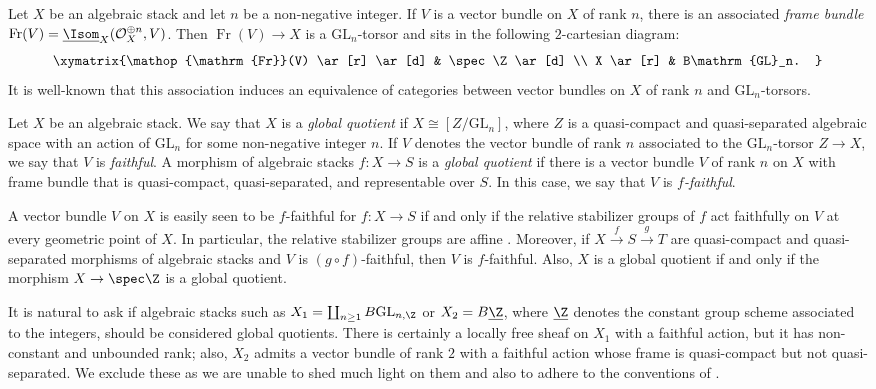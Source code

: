 \documentclass[reqno,a4paper]{amsart}
\numberwithin{Theorem}{section}
\newcommand{\Orb}{\mathcal{O}}
\renewcommand{\GL}{\mathrm{GL}}
\theoremstyle{plain}
\theoremstyle{remark}
\newcommand{\classB}{B}
\DeclareMathOperator{\Frame}{Fr}
\begin{document}
Let $X$ be an algebraic stack and let $n$ be a non-negative
integer. If $V$ is a vector bundle on $X$ of rank $n$, there is an
associated \emph{frame bundle}
$\Frame(V) = \underline{\Isom}_X(\Orb_X^{\oplus n},V)$.  Then
$\Frame(V) \to X$ is a $\GL_n$-torsor and sits in the following
$2$-cartesian diagram:
\[
  \xymatrix{\Frame(V) \ar[r] \ar[d] & \spec \Z\ar[d] \\ X \ar[r] & \classB \GL_n. }
\]
It is well-known that this association induces an equivalence of
categories between vector bundles on $X$ of rank $n$ and
$\GL_n$-torsors. 
\begin{Definition} \label{def:globalquotient}
  Let $X$ be an algebraic stack. We say that $X$ is a \emph{global
    quotient} if $X \cong [Z/\GL_n]$, where $Z$ is a quasi-compact and quasi-separated algebraic space
  with an action of $\GL_n$ for some non-negative integer $n$. If $V$
  denotes the vector bundle of rank $n$ associated to the
  $\GL_n$-torsor $Z \to X$, we say that $V$ is \emph{faithful}. A
  morphism of algebraic stacks $f\colon X \to S$ is a \emph{global
    quotient} if there is a vector bundle $V$ of rank $n$ on $X$ with
   frame bundle that is quasi-compact, quasi-separated, and representable over $S$. In this case, we say that $V$
  is \emph{$f$-faithful}.
\end{Definition}
\begin{remark}
  A vector bundle $V$ on $X$ is easily seen to be $f$-faithful for
  $f\colon X \to S$ if and only if the relative stabilizer groups of
  $f$ act faithfully on $V$ at every geometric point of $X$. In particular, the relative stabilizer groups are affine \cite[Cor.~VI${}_{\mathrm{B}}$.1.4.2]{SGA3-I-NEW}. Moreover, if $X \xrightarrow{f}S \xrightarrow{g} T$ are quasi-compact and quasi-separated morphisms of algebraic stacks and $V$ is $(g\circ f)$-faithful, then
  $V$ is $f$-faithful. Also, $X$ is a global quotient if and only if
  the morphism $X \to \spec \Z$ is a global quotient.
\end{remark}
\begin{remark} \label{rem:vbfiniterank}
  It is natural to ask if algebraic stacks such as
  $X_1=\coprod_{n\geq 1} \classB \GL_{n,\Z}$ or $X_2=\classB \underline{\Z}$, where $\underline{\Z}$ denotes the constant group scheme associated to the integers, should be considered global
  quotients. There is certainly a locally free sheaf on $X_1$ with a faithful
  action, but it has non-constant and unbounded rank; also, $X_2$ admits a vector bundle of rank $2$ with a faithful action whose frame is quasi-compact but not quasi-separated. We exclude these as we are unable to shed much light on them and also to adhere to the conventions of \cite[\S 5]{2013arXiv1306.5418G}.
\end{remark}
\end{document}
